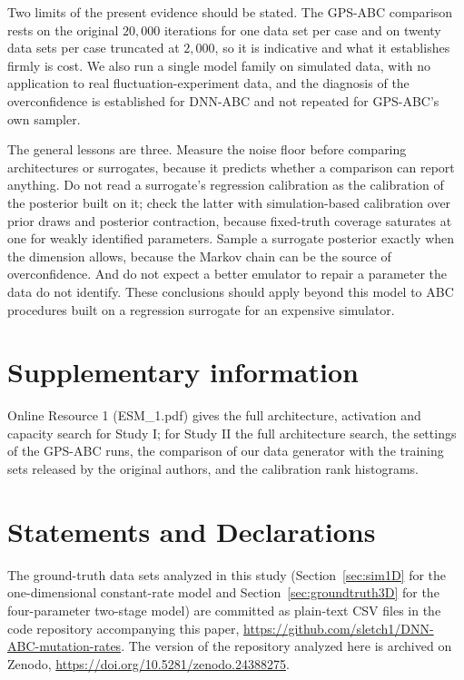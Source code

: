 \documentclass[sn-basic,iicol,pdflatex]{sn-jnl}
\begin{document}
Two limits of the present evidence should be stated. The GPS-ABC comparison rests on the original $20{,}000$ iterations for one data set per case and on twenty data sets per case truncated at $2{,}000$, so it is indicative and what it establishes firmly is cost. We also run a single model family on simulated data, with no application to real fluctuation-experiment data, and the diagnosis of the overconfidence is established for DNN-ABC and not repeated for GPS-ABC's own sampler.

The general lessons are three. Measure the noise floor before comparing architectures or surrogates, because it predicts whether
a comparison can report anything. Do not read a surrogate's regression calibration as the calibration of the posterior built on it;
check the latter with simulation-based calibration over prior draws and posterior contraction, because fixed-truth coverage
saturates at one for weakly identified parameters. Sample a surrogate posterior exactly when the dimension allows, because the Markov chain can be the source of overconfidence. And do not expect a better emulator to repair a parameter the data do not identify. These
conclusions should apply beyond this model to ABC procedures built on a regression surrogate for an expensive simulator.

\backmatter

\section*{Supplementary information}
Online Resource 1 (ESM\_1.pdf) gives the full architecture, activation and capacity search for Study I; for Study II the full architecture search, the settings of the GPS-ABC runs, the comparison of our data generator with the training sets released by the original authors, and the calibration rank histograms.

\section*{Statements and Declarations}

The ground-truth data sets analyzed in this study (Section~\ref{sec:sim1D}
for the one-dimensional constant-rate model and Section~\ref{sec:groundtruth3D}
for the four-parameter two-stage model) are committed as plain-text CSV files in the code
repository accompanying this paper, \url{https://github.com/sletch1/DNN-ABC-mutation-rates}.
The version of the repository analyzed here is archived on Zenodo, \url{https://doi.org/10.5281/zenodo.24388275}.
\end{document}
